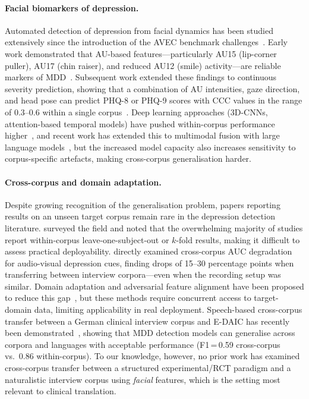 \documentclass[sigconf]{acmart}
\begin{document}
\paragraph{Facial biomarkers of depression.}
Automated detection of depression from facial dynamics has been studied extensively
since the introduction of the AVEC benchmark challenges~\cite{ringeval2019avec,
valstar2016avec2016}. Early work demonstrated that AU-based features---particularly
AU15 (lip-corner puller), AU17 (chin raiser), and reduced AU12 (smile) activity---are
reliable markers of MDD~\cite{girard2014,jain2014depression,SchullerRingeval2015}.
Subsequent work extended these findings to continuous severity prediction,
showing that a combination of AU intensities, gaze direction, and head pose
can predict PHQ-8 or PHQ-9 scores with CCC values in the range of 0.3--0.6
within a single corpus~\cite{valstar2016avec2016,
ringeval2019avec,pampouchidou2017automatic}.
Deep learning approaches (3D-CNNs, attention-based temporal models) have pushed
within-corpus performance higher~\cite{yang2017dcnn,zhu2017multimodal},
and recent work has extended this to multimodal fusion with large language
models~\cite{anon2024multimodal,anon2023llm},
but the increased model capacity also increases sensitivity to corpus-specific
artefacts, making cross-corpus generalisation harder.

\paragraph{Cross-corpus and domain adaptation.}
Despite growing recognition of the generalisation problem, papers reporting
results on an unseen target corpus remain rare in the depression detection
literature. \citet{cummins2015review} surveyed the field and noted that the
overwhelming majority of studies report within-corpus leave-one-subject-out or
$k$-fold results, making it difficult to assess practical deployability.
\citet{jaiswal2019mismatch} directly examined cross-corpus AUC degradation for
audio-visual depression cues, finding drops of 15--30 percentage points when
transferring between interview corpora---even when the recording setup was similar.
Domain adaptation and adversarial feature alignment have been proposed to reduce
this gap~\cite{zhao2020emotion,zhang2020domain}, but these methods require
concurrent access to target-domain data, limiting applicability in real deployment.
Speech-based cross-corpus transfer between a German clinical interview corpus and
E-DAIC has recently been demonstrated~\cite{anon2025crosscultural}, showing that
MDD detection models can generalise across corpora and languages with acceptable
performance (F1\,=\,0.59 cross-corpus vs.\ 0.86 within-corpus).
To our knowledge, however, no prior work has examined cross-corpus transfer between
a structured experimental/RCT paradigm and a naturalistic interview corpus using
\emph{facial} features, which is the setting most relevant to clinical translation.
\end{document}
